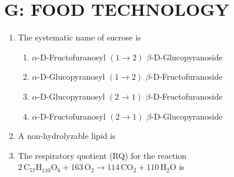 \documentclass[a4paper,10pt]{article}
\begin{document}
\section*{G: FOOD TECHNOLOGY}
\begin{enumerate}
    \item The systematic name of sucrose is
    
    \hfill{}
    \begin{enumerate}[label=\Alph*)]
        \item $\alpha$-D-Fructofuranosyl $(1 \rightarrow 2)$ $\beta$-D-Glucopyranoside
        \item $\alpha$-D-Glucopyranosyl $(1 \rightarrow 2)$ $\beta$-D-Fructofuranoside
        \item $\alpha$-D-Glucopyranosyl $(2 \rightarrow 1)$ $\beta$-D-Fructofuranoside
        \item $\alpha$-D-Fructofuranosyl $(2 \rightarrow 1)$ $\beta$-D-Glucopyranoside
    \end{enumerate}
    
    \item A non-hydrolyzable lipid is
    
    \hfill{}
    \begin{enumerate}[label=\Alph*)]
    \end{enumerate}
    
    \item The respiratory quotient (RQ) for the reaction $2\,\text{C}_{57}\text{H}_{110}\text{O}_6 + 163\,\text{O}_2 \rightarrow 114\,\text{CO}_2 + 110\,\text{H}_2\text{O}$ is
    
    \hfill{}
    \begin{enumerate}[label=\Alph*)]
    \end{enumerate}
    

\end{enumerate}
\end{document}
